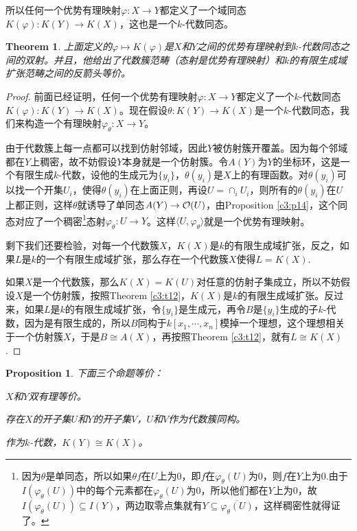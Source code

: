 \documentclass[9pt]{extarticle}
\theoremstyle{plain}%
\newtheorem{pro}[defi]{Proposition}%
\newtheorem{theo}[defi]{Theorem}%
\begin{document}
所以任何一个优势有理映射$\varphi:X\to Y$都定义了一个域同态$K(\varphi):K(Y)\to K(X)$，这也是一个$k$-代数同态。
\begin{theo}
	上面定义的$\varphi\mapsto K(\varphi)$是$X$和$Y$之间的优势有理映射到$k$-代数同态之间的双射。并且，他给出了代数簇范畴（态射是优势有理映射）和$k$的有限生成域扩张范畴之间的反箭头等价。
\end{theo}
\begin{proof}
	前面已经证明，任何一个优势有理映射$\varphi:X\to Y$都定义了一个$k$-代数同态$K(\varphi):K(Y)\to K(X)$。现在假设$\theta:K(Y)\to K(X)$是一个$k$-代数同态，我们来构造一个有理映射$\varphi_\theta:X\to Y$。

	由于代数簇上每一点都可以找到仿射邻域，因此$Y$被仿射簇开覆盖。因为每个邻域都在$Y$上稠密，故不妨假设$Y$本身就是一个仿射簇。令$A(Y)$为$Y$的坐标环，这是一个有限生成$k$-代数，设他的生成元为$\{y_i\}$，$\theta(y_i)$是$X$上的有理函数。对$\theta(y_i)$可以找一个开集$U_i$，使得$\theta(y_i)$在上面正则，再设$U=\cap_i U_i$，则所有的$\theta(y_i)$在$U$上都正则，这样$\theta$就诱导了单同态$A(Y)\to \mathcal{O}(U)$，由Proposition \ref{c3:p14}，这个同态对应了一个稠密\footnote{因为$\theta$是单同态，所以如果$\theta f$在$U$上为$0$，即$f$在$\varphi_\theta(U)$为$0$，则$f$在$Y$上为$0$.由于$I(\varphi_\theta(U))$中的每个元素都在$\varphi_\theta(U)$为$0$，所以他们都在$Y$上为$0$，故$I(\varphi_\theta(U))\subseteq I(Y)$，两边取零点集就有$Y \subseteq \overline{\varphi_\theta(U)}$，这样稠密性就得证了。}态射$\varphi_\theta:U\to Y$。这样$\langle U,\varphi_\theta\rangle$就是一个优势有理映射。

	剩下我们还要检验，对每一个代数簇$X$，$K(X)$是$k$的有限生成域扩张，反之，如果$L$是$k$的一个有限生成域扩张，那么存在一个代数簇$X$使得$L=K(X)$.

	如果$X$是一个代数簇，那么$K(X)=K(U)$对任意的仿射子集成立，所以不妨假设$X$是一个仿射簇，按照Theorem \ref{c3:t12}，$K(X)$是$k$的有限生成域扩张。反过来，如果$L$是$k$的有限生成域扩张，令$\{y_i\}$是生成元，再令$B$是$\{y_i\}$生成的子$k$-代数，因为是有限生成的，所以$B$同构于$k[x_1,\cdots,x_n]$模掉一个理想，这个理想相关于一个仿射簇$X$，于是$B\cong A(X)$，再按照Theorem \ref{c3:t12}，就有$L\cong K(X)$.
\end{proof}
\begin{pro}
	下面三个命题等价：

	 $X$和$Y$双有理等价。

	 存在$X$的开子集$U$和$Y$的开子集$V$，$U$和$V$作为代数簇同构。

	 作为$k$-代数，$K(Y)\cong K(X)$。
\end{pro}
\end{document}
